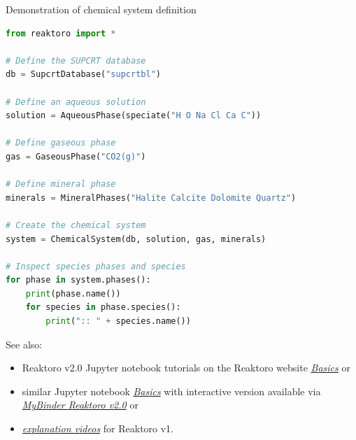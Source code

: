 %
%
\begin{frame}{Demonstration of chemical system definition}
	
\begin{lstlisting}[language=Python, caption=Chemical system definition]
from reaktoro import *

# Define the SUPCRT database
db = SupcrtDatabase("supcrtbl")

# Define an aqueous solution
solution = AqueousPhase(speciate("H O Na Cl Ca C")) 

# Define gaseous phase
gas = GaseousPhase("CO2(g)")

# Define mineral phase
minerals = MineralPhases("Halite Calcite Dolomite Quartz")

# Create the chemical system
system = ChemicalSystem(db, solution, gas, minerals)

# Inspect species phases and species
for phase in system.phases():
    print(phase.name())
    for species in phase.species():
        print(":: " + species.name())
\end{lstlisting}
See also:
\begin{itemize}
    \item Reaktoro v2.0 Jupyter notebook tutorials on the Reaktoro website \href{https://reaktoro.org/tutorials/basics/index.html}{\textcolor{indigo(dye)}{\it Basics}} or
    \item similar Jupyter notebook  \href{https://github.com/mtsveta/reaktoro-v2-workshop/tree/main/tutorials/basics}{\textcolor{indigo(dye)}{\it Basics}} with interactive version available via \href{https://mybinder.org/v2/gh/mtsveta/reaktoro-v2-workshop/main?labpath=overview.ipynb}{\textcolor{indigo(dye)}{\it MyBinder Reaktoro v2.0}} or 
    \item \href{https://polybox.ethz.ch/index.php/s/qStBnxUnry648U5}{\textcolor{indigo(dye)}{\it explanation videos}} for Reaktoro v1.
\end{itemize}
%
\end{frame}


